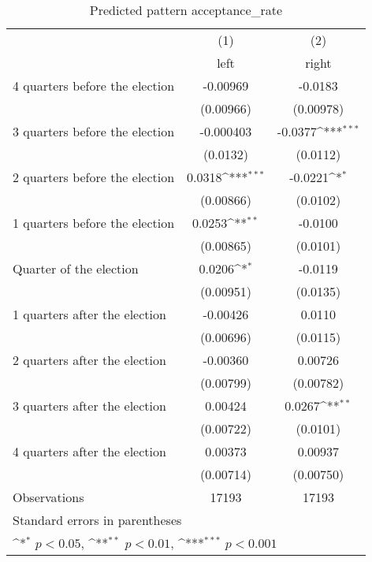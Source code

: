\begin{table}[htbp]\centering
\def\sym#1{\ifmmode^{#1}\else\(^{#1}\)\fi}
\caption{Predicted pattern acceptance\_rate}
\begin{tabular}{l*{2}{c}}
\hline\hline
                    &\multicolumn{1}{c}{(1)}&\multicolumn{1}{c}{(2)}\\
                    &\multicolumn{1}{c}{left}&\multicolumn{1}{c}{right}\\
\hline
 4 quarters before the election&    -0.00969         &     -0.0183         \\
                    &   (0.00966)         &   (0.00978)         \\
[1em]
 3 quarters before the election&   -0.000403         &     -0.0377\sym{***}\\
                    &    (0.0132)         &    (0.0112)         \\
[1em]
 2 quarters before the election&      0.0318\sym{***}&     -0.0221\sym{*}  \\
                    &   (0.00866)         &    (0.0102)         \\
[1em]
 1 quarters before the election&      0.0253\sym{**} &     -0.0100         \\
                    &   (0.00865)         &    (0.0101)         \\
[1em]
Quarter of the election&      0.0206\sym{*}  &     -0.0119         \\
                    &   (0.00951)         &    (0.0135)         \\
[1em]
 1 quarters after the election&    -0.00426         &      0.0110         \\
                    &   (0.00696)         &    (0.0115)         \\
[1em]
 2 quarters after the election&    -0.00360         &     0.00726         \\
                    &   (0.00799)         &   (0.00782)         \\
[1em]
 3 quarters after the election&     0.00424         &      0.0267\sym{**} \\
                    &   (0.00722)         &    (0.0101)         \\
[1em]
 4 quarters after the election&     0.00373         &     0.00937         \\
                    &   (0.00714)         &   (0.00750)         \\
\hline
Observations        &       17193         &       17193         \\
\hline\hline
\multicolumn{3}{l}{\footnotesize Standard errors in parentheses}\\
\multicolumn{3}{l}{\footnotesize \sym{*} \(p<0.05\), \sym{**} \(p<0.01\), \sym{***} \(p<0.001\)}\\
\end{tabular}
\end{table}
